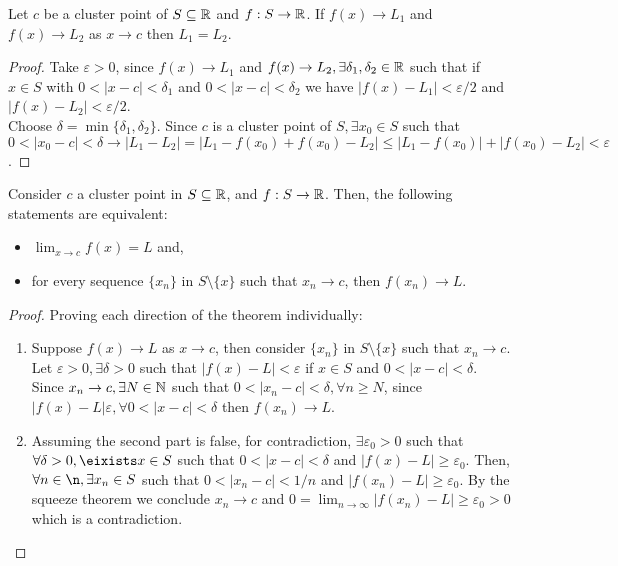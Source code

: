 \begin{theorem}
    Let $c$ be a cluster point of $S \subseteq \mathbb{R}$ and $f: S \to \mathbb{R}$. If $f(x) \to L_1$ and $f(x) \to L_2$ as $x \to c$ then $L_1 = L_2$.
\end{theorem}

\begin{proof}
    Take $\varepsilon > 0$, since $f(x) \to L_1$ and $f(x) \to L_2, \exists \delta_1, \delta_2 \in \mathbb{R}$ such that if $x \in S$ with $0 < |x-c| < \delta_1$ and $0 < |x-c| < \delta_2$ we have $|f(x) - L_1| < \varepsilon/2$ and $|f(x) - L_2| < \varepsilon/2$. \\
    Choose $\delta = \min\{\delta_1, \delta_2\}$. Since $c$ is a cluster point of $S, \exists x_0 \in S$ such that $0 < |x_0-c| < \delta \longrightarrow |L_1-L_2| = |L_1 - f(x_0) + f(x_0) - L_2| \leq |L_1 - f(x_0)| + |f(x_0) - L_2| < \varepsilon$.
\end{proof}

\begin{theorem}
    Consider $c$ a cluster point in $S \subseteq \mathbb{R}$, and $f: S \to \mathbb{R}$. Then, the following statements are equivalent:
    \begin{itemize}
        \item $\lim_{x \to c} f(x) = L$ and,
        \item for every sequence $\{x_n\}$ in $S \setminus \{x\}$ such that $x_n \to c$, then $f(x_n) \to L$.
    \end{itemize}
\end{theorem}

\begin{proof}
    Proving each direction of the theorem individually:
    \begin{enumerate}
        \item Suppose $f(x) \to L$ as $x \to c$, then consider $\{x_n\}$ in $S \setminus \{x\}$ such that $x_n \to c$. Let $\varepsilon > 0, \exists \delta > 0$ such that $|f(x) - L| < \varepsilon$ if $x \in S$ and $0 < |x-c| < \delta$. Since $x_n \to c, \exists N \in \mathbb{N}$ such that $0 < |x_n-c| < \delta, \forall n \geq N$, since $|f(x) - L| \varepsilon, \forall 0 < |x-c| < \delta$ then $f(x_n) \to L$.
        \item Assuming the second part is false, for contradiction, $\exists \varepsilon_0 > 0$ such that $\forall \delta > 0, \eixists x \in S$ such that $0 < |x-c| < \delta$ and $|f(x) - L| \geq \varepsilon_0$. Then, $\forall n \in \n, \exists x_n \in S$ such that $0 < |x_n - c| < 1/n$ and $|f(x_n) - L| \geq \varepsilon_0$. By the squeeze theorem we conclude $x_n \to c$ and $0 = \lim_{n \to \infty} |f(x_n) - L| \geq \varepsilon_0 > 0$ which is a contradiction.
    \end{enumerate}
\end{proof}

